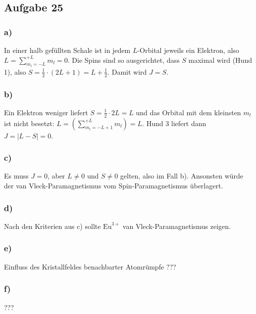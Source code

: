 \subsection*{Aufgabe 25}

\subsubsection*{a)}
In einer halb gefüllten Schale ist in jedem $L$-Orbital jeweils ein Elektron,
also $L = \sum_{m_l = -L}^{+L} m_l  = 0$. Die Spins sind so ausgerichtet, dass $S$
maximal wird (Hund 1), also $S = \frac{1}{2} \cdot (2 L + 1) = L + \frac{1}{2}$.
Damit wird $J = S$.

\subsubsection*{b)}
Ein Elektron weniger liefert $S = \frac{1}{2} \cdot 2 L = L$
und das Orbital mit dem kleinsten $m_l$ ist nicht besetzt:
$L = (\sum_{m_l = - L + 1}^{+ L} m_l) =  L$. Hund 3 liefert dann
$J = | L - S | = 0$.

\subsubsection*{c)}
Es muss $J = 0$, aber $L \ne 0$ und $S \ne 0$ gelten, also im Fall b).
Ansonsten würde der van Vleck-Paramagnetismus vom Spin-Paramagnetismus überlagert.

\subsubsection*{d)}
Nach den Kriterien aus c) sollte $\text{Eu}^{3+}$ van Vleck-Paramagnetismus zeigen.

\subsubsection*{e)}
Einfluss des Kristallfeldes benachbarter Atomrümpfe ???

\subsubsection*{f)}
???
